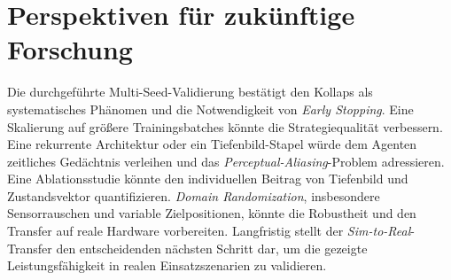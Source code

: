 \section{Perspektiven für zukünftige Forschung}

Die durchgeführte Multi-Seed-Validierung bestätigt den Kollaps als
systematisches Phänomen und die Notwendigkeit von \textit{Early Stopping}. Eine
Skalierung auf größere Trainingsbatches könnte die Strategiequalität
verbessern. Eine rekurrente Architektur oder ein
Tiefenbild-Stapel würde dem Agenten zeitliches Gedächtnis verleihen und
das \textit{Perceptual-Aliasing}-Problem adressieren. Eine Ablationsstudie könnte
den individuellen Beitrag von Tiefenbild und Zustandsvektor
quantifizieren. \textit{Domain Randomization}, insbesondere Sensorrauschen und
variable Zielpositionen, könnte die Robustheit und den Transfer auf reale
Hardware vorbereiten. Langfristig stellt der \textit{Sim-to-Real}-Transfer den
entscheidenden nächsten Schritt dar, um die gezeigte Leistungsfähigkeit
in realen Einsatzszenarien zu validieren.
